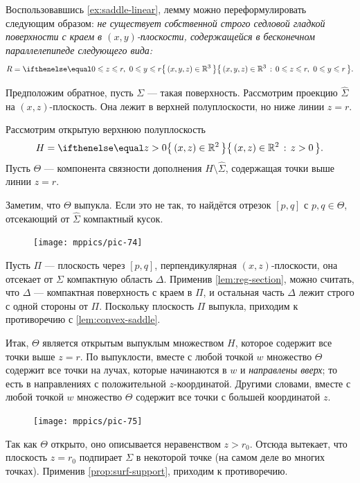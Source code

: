 Воспользовавшись \ref{ex:saddle-linear}, лемму можно переформулировать следующим образом:
\textit{не существует собственной строго седловой гладкой поверхности 
с краем в $(x,y)$-плоскости,
содержащейся в бесконечном параллелепипеде следующего вида:}
\[R=\set{(x,y,z)\in\mathbb{R}^3}{0\le z\le r,\  0\le y\le r}.\]

Предположим обратное, пусть $\Sigma$ --- такая поверхность.
Рассмотрим проекцию $\hat \Sigma$ на $(x,z)$-плоскость.
Она лежит в верхней полуплоскости, но ниже линии $z=r$.

Рассмотрим открытую верхнюю полуплоскость
\[H=\set{(x,z)\in \mathbb{R}^2}{z> 0}.\] 
Пусть $\Theta$ --- компонента связности дополнения $H\setminus \hat \Sigma$, содержащая точки выше линии $z=r$.

Заметим, что $\Theta$ выпукла.
Если это не так, то найдётся отрезок $[p,q]$ с $p,q\in \Theta$, отсекающий от $\hat\Sigma$ компактный кусок.
\begin{figure}[!ht]
\vskip-1mm
\centering
\texttt{[image: mppics/pic-74]}
\vskip-1mm
\end{figure}
Пусть $\Pi$ --- плоскость через $[p,q]$, перпендикулярная $(x,z)$-плоскости, она отсекает от $\Sigma$ компактную область $\Delta$.
Применив \ref{lem:reg-section}, можно считать, что $\Delta$ --- компактная поверхность с краем в $\Pi$, и остальная часть $\Delta$ лежит строго с одной стороны от $\Pi$.
Поскольку плоскость $\Pi$ выпукла, приходим к противоречию с \ref{lem:convex-saddle}.

Итак, $\Theta$ является открытым выпуклым множеством $H$, которое содержит все точки выше $z=r$.
По выпуклости, вместе с любой точкой $w$ множество $\Theta$ содержит все точки на лучах, которые начинаются в $w$ и \textit{направлены вверх}; то есть в направлениях с положительной $z$-координатой. 
Другими словами, вместе с любой точкой $w$
множество $\Theta$ содержит все точки с большей координатой $z$.
\begin{figure}[!ht]
\vskip-1mm
\centering
\texttt{[image: mppics/pic-75]}
\vskip-1mm
\end{figure}
Так как $\Theta$ открыто, оно описывается неравенством $z>r_0$.
Отсюда вытекает, что плоскость $z=r_0$ подпирает $\Sigma$ в некоторой точке (на самом деле во многих точках).
Применив \ref{prop:surf-support}, приходим к противоречию.
\qeds



